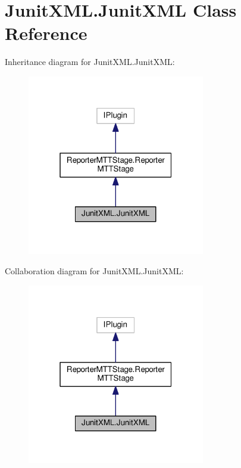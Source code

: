 \hypertarget{class_junit_x_m_l_1_1_junit_x_m_l}{\section{Junit\-X\-M\-L.\-Junit\-X\-M\-L Class Reference}
\label{class_junit_x_m_l_1_1_junit_x_m_l}
}


Inheritance diagram for Junit\-X\-M\-L.\-Junit\-X\-M\-L\-:
\nopagebreak
\begin{figure}[H]
\begin{center}
\leavevmode
\includegraphics[width=220pt]{class_junit_x_m_l_1_1_junit_x_m_l__inherit__graph}
\end{center}
\end{figure}


Collaboration diagram for Junit\-X\-M\-L.\-Junit\-X\-M\-L\-:
\nopagebreak
\begin{figure}[H]
\begin{center}
\leavevmode
\includegraphics[width=220pt]{class_junit_x_m_l_1_1_junit_x_m_l__coll__graph}
\end{center}
\end{figure}
